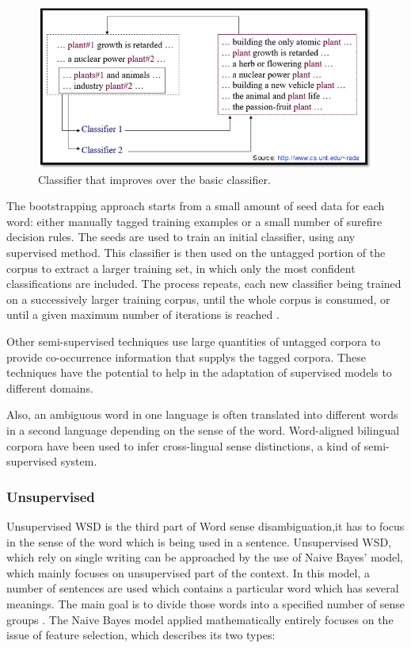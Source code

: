 \begin{figure}[tbh]
	\begin{center}
		\includegraphics[width=\columnwidth]{Union_Background_Chart_semi}
	\end{center}
	\caption{Classifier that improves over the basic classifier. \label{fig3}}
\end{figure}

The bootstrapping approach starts from a small amount of seed data for each word: either manually tagged training examples or a small number of surefire decision rules. 
The seeds are used to train an initial classifier, using any supervised method. This classifier is then used on the untagged portion of the corpus to extract a larger training set, in which only the most confident classifications are included. 
The process repeats, each new classifier being trained on a successively larger training corpus, until the whole corpus is consumed, 
or until a given maximum number of iterations is reached \cite{Blascheck2016}.

Other semi-supervised techniques use large quantities of untagged corpora to provide co-occurrence information that supplys the tagged corpora. 
These techniques have the potential to help in the adaptation of supervised models to different domains.

Also, an ambiguous word in one language is often translated into different words in a second language depending on the sense of the word. 
Word-aligned bilingual corpora have been used to infer cross-lingual sense distinctions, a kind of semi-supervised system\cite{Cheslow2014}.

\subsubsection*{Unsupervised}
Unsupervised WSD is the third part of Word sense disambiguation,it has to focus in the sense of the word which is being used in a sentence.  
Unsupervised WSD, which rely on single writing can be approached by the use of Naive Bayes' model, which mainly focuses on unsupervised part of the context. 
In this model, a number of sentences are used which contains a particular word which has several meanings. 
The main goal is to divide those words into a specified number of sense groups \cite{4028513}.
The Naive Bayes model applied mathematically entirely focuses on the issue of feature selection, which describes its two types:


